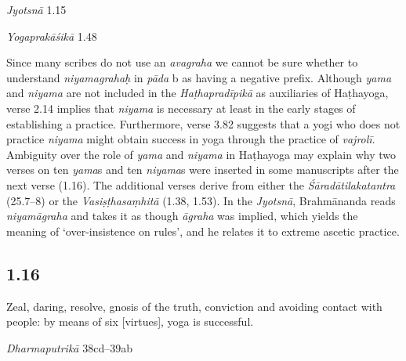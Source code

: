 \begin{ekdosis}
\begin{testimonia}[hp01_015]
\emph{Jyotsnā} 1.15

\begin{versinnote}
\end{versinnote}

\emph{Yogaprakāśikā} 1.48

\begin{versinnote}
\end{versinnote}

\end{testimonia}

\begin{philcomm}[hp01_015]        
Since many scribes do not use an \emph{avagraha} we cannot be sure whether to understand  \emph{niyamagrahaḥ} in \emph{pāda} b as having a negative prefix. Although \emph{yama} and \emph{niyama} are not included in the \emph{Haṭhapradīpikā} as auxiliaries of Haṭhayoga, verse 2.14 implies that \emph{niyama} is necessary at least in the early stages of establishing a practice. Furthermore, verse 3.82 suggests that a yogi who does not practice \emph{niyama} might obtain success in yoga through the practice of \textit{vajrolī}. Ambiguity over the role of \emph{yama} and \emph{niyama} in Haṭhayoga may explain why two verses on ten \emph{yama}s and ten \emph{niyama}s were inserted in some manuscripts after the next verse (1.16). The additional verses derive from either the \emph{Śāradātilakatantra} (25.7–8) or the  \emph{Vasiṣṭhasaṃhitā} (1.38, 1.53). In the \emph{Jyotsnā}, Brahmānanda reads \emph{niyamāgraha} and takes it as though \emph{āgraha} was implied, which yields the meaning of ‘over-insistence on rules’, and he relates it to extreme ascetic practice.
\end{philcomm}

\subsection*{1.16}
\begin{translation}[hp01_016]
Zeal, daring, resolve, gnosis of the truth, conviction and avoiding contact with people: by means of six [virtues], yoga is successful.
\end{translation}

\begin{sources}[hp01_016]
\emph{Dharmaputrikā} 38cd–39ab


\end{sources}
\end{ekdosis}

